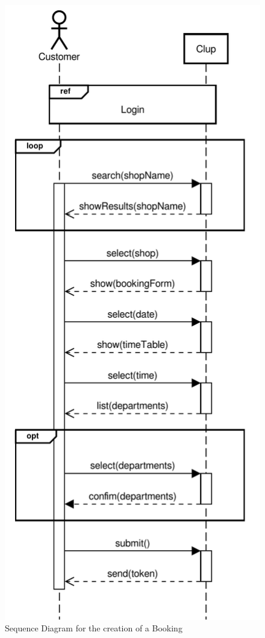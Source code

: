 \begin{figure}[H]
    \centering
    \includegraphics[scale=0.9]{Images/Sequence/booking-loop_sequence_straight.pdf}
    \caption{Sequence Diagram for the creation of a Booking}
\end{figure}
